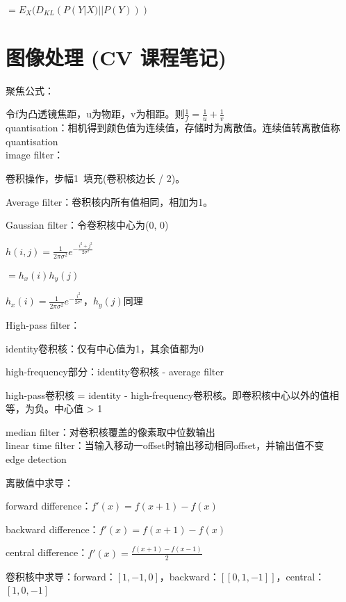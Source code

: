 \documentclass[UTF8]{ctexart}
\begin{document}
  \quad \quad $ = E_X(D_{KL}(P(Y | X) || P(Y)))$

\section{图像处理 (CV 课程笔记)}
\noindent 聚焦公式：

  令f为凸透镜焦距，u为物距，v为相距。则$\frac{1}{f} = \frac{1}{u} + \frac{1}{v}$\\
quantisation：相机得到颜色值为连续值，存储时为离散值。连续值转离散值称quantisation\\
image filter：

  卷积操作，步幅1\ 填充(卷积核边长 / 2)。
  
  Average filter：卷积核内所有值相同，相加为1。

  Gaussian filter：令卷积核中心为(0, 0)

  \quad $h(i, j) = \frac{1}{2\pi\sigma^2}e^{-\frac{i^2+j^2}{2\sigma^2}}$

  \quad \quad $ = h_x(i) h_y(j)$

  \quad \quad $h_x(i) = \frac{1}{2\pi\sigma^2}e^{-\frac{i^2}{2\sigma^2}}$，$h_y(j)$同理
  
  High-pass filter：

  \quad identity卷积核：仅有中心值为1，其余值都为0

  \quad high-frequency部分：identity卷积核 - average filter

  \quad high-pass卷积核 = identity - high-frequency卷积核。即卷积核中心以外的值相等，为负。中心值 > 1

  median filter：对卷积核覆盖的像素取中位数输出\\
linear time filter：当输入移动一offset时输出移动相同offset，并输出值不变\\
edge detection

  离散值中求导：
  
  \quad forward difference：$f'(x) = f(x + 1) - f(x)$

  \quad backward difference：$f'(x) = f(x + 1) - f(x)$
  
  \quad central difference：$f'(x) = \frac{f(x + 1) - f(x - 1)}{2}$

  卷积核中求导：forward：$[1, -1, 0]$，backward：$[[0, 1, -1]]$，central：$[1, 0, -1]$
\end{document}

